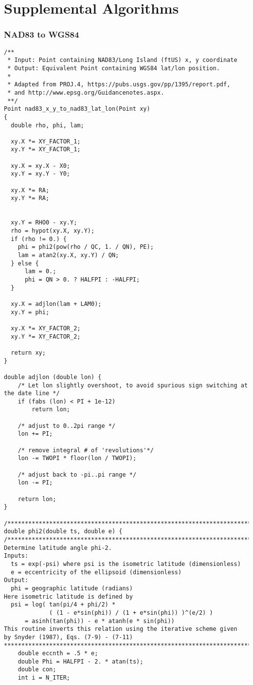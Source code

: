 \documentclass{article}
\begin{document}
\clearpage
{}%
\renewcommand*{\thepage}{B-\arabic{page}}
\appendix
\section{Supplemental Algorithms}
\subsubsection{NAD83 to WGS84}
\begin{lstlisting}
/**
 * Input: Point containing NAD83/Long Island (ftUS) x, y coordinate
 * Output: Equivalent Point containing WGS84 lat/lon position.
 *
 * Adapted from PROJ.4, https://pubs.usgs.gov/pp/1395/report.pdf,
 * and http://www.epsg.org/Guidancenotes.aspx.
 **/
Point nad83_x_y_to_nad83_lat_lon(Point xy)
{
  double rho, phi, lam;

  xy.X *= XY_FACTOR_1;
  xy.Y *= XY_FACTOR_1;

  xy.X = xy.X - X0;
  xy.Y = xy.Y - Y0;

  xy.X *= RA;
  xy.Y *= RA;


  xy.Y = RHO0 - xy.Y;
  rho = hypot(xy.X, xy.Y);
  if (rho != 0.) {
    phi = phi2(pow(rho / QC, 1. / QN), PE);
    lam = atan2(xy.X, xy.Y) / QN;
  } else {
      lam = 0.;
      phi = QN > 0. ? HALFPI : -HALFPI;
  }

  xy.X = adjlon(lam + LAM0);
  xy.Y = phi;

  xy.X *= XY_FACTOR_2;
  xy.Y *= XY_FACTOR_2;

  return xy;
}

double adjlon (double lon) {
    /* Let lon slightly overshoot, to avoid spurious sign switching at the date line */
    if (fabs (lon) < PI + 1e-12)
        return lon;

    /* adjust to 0..2pi range */
    lon += PI;

    /* remove integral # of 'revolutions'*/
    lon -= TWOPI * floor(lon / TWOPI);

    /* adjust back to -pi..pi range */
    lon -= PI;

    return lon;
}

/*****************************************************************************/
double phi2(double ts, double e) {
/******************************************************************************
Determine latitude angle phi-2.
Inputs:
  ts = exp(-psi) where psi is the isometric latitude (dimensionless)
  e = eccentricity of the ellipsoid (dimensionless)
Output:
  phi = geographic latitude (radians)
Here isometric latitude is defined by
  psi = log( tan(pi/4 + phi/2) *
             ( (1 - e*sin(phi)) / (1 + e*sin(phi)) )^(e/2) )
      = asinh(tan(phi)) - e * atanh(e * sin(phi))
This routine inverts this relation using the iterative scheme given
by Snyder (1987), Eqs. (7-9) - (7-11)
*******************************************************************************/
    double eccnth = .5 * e;
    double Phi = HALFPI - 2. * atan(ts);
    double con;
    int i = N_ITER;


\end{lstlisting}
\end{document}

